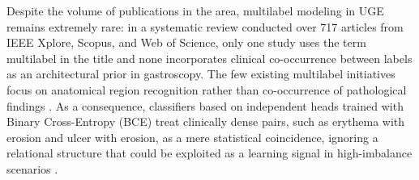 \documentclass[12pt]{article}
\begin{document}

Despite the volume of publications in the area, multilabel modeling in UGE remains extremely rare: in a systematic review conducted over 717 articles from IEEE Xplore, Scopus, and Web of Science, only one study uses the term multilabel in the title and none incorporates clinical co-occurrence between labels as an architectural prior in gastroscopy. The few existing multilabel initiatives focus on anatomical region recognition rather than co-occurrence of pathological findings \cite{WOS:000780549400001}. As a consequence, classifiers based on independent heads trained with Binary Cross-Entropy (BCE) treat clinically dense pairs, such as erythema with erosion and ulcer with erosion, as a mere statistical coincidence, ignoring a relational structure that could be exploited as a learning signal in high-imbalance scenarios \cite{Krenzer2026276}.

\end{document}

